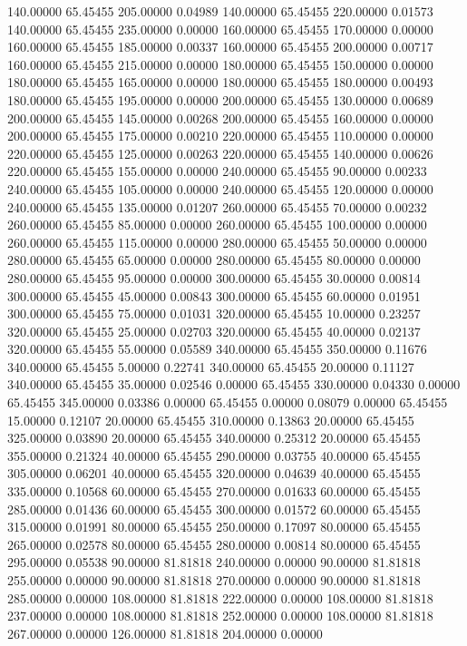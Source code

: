 140.00000 65.45455 205.00000 0.04989
140.00000 65.45455 220.00000 0.01573
140.00000 65.45455 235.00000 0.00000
160.00000 65.45455 170.00000 0.00000
160.00000 65.45455 185.00000 0.00337
160.00000 65.45455 200.00000 0.00717
160.00000 65.45455 215.00000 0.00000
180.00000 65.45455 150.00000 0.00000
180.00000 65.45455 165.00000 0.00000
180.00000 65.45455 180.00000 0.00493
180.00000 65.45455 195.00000 0.00000
200.00000 65.45455 130.00000 0.00689
200.00000 65.45455 145.00000 0.00268
200.00000 65.45455 160.00000 0.00000
200.00000 65.45455 175.00000 0.00210
220.00000 65.45455 110.00000 0.00000
220.00000 65.45455 125.00000 0.00263
220.00000 65.45455 140.00000 0.00626
220.00000 65.45455 155.00000 0.00000
240.00000 65.45455 90.00000 0.00233
240.00000 65.45455 105.00000 0.00000
240.00000 65.45455 120.00000 0.00000
240.00000 65.45455 135.00000 0.01207
260.00000 65.45455 70.00000 0.00232
260.00000 65.45455 85.00000 0.00000
260.00000 65.45455 100.00000 0.00000
260.00000 65.45455 115.00000 0.00000
280.00000 65.45455 50.00000 0.00000
280.00000 65.45455 65.00000 0.00000
280.00000 65.45455 80.00000 0.00000
280.00000 65.45455 95.00000 0.00000
300.00000 65.45455 30.00000 0.00814
300.00000 65.45455 45.00000 0.00843
300.00000 65.45455 60.00000 0.01951
300.00000 65.45455 75.00000 0.01031
320.00000 65.45455 10.00000 0.23257
320.00000 65.45455 25.00000 0.02703
320.00000 65.45455 40.00000 0.02137
320.00000 65.45455 55.00000 0.05589
340.00000 65.45455 350.00000 0.11676
340.00000 65.45455 5.00000 0.22741
340.00000 65.45455 20.00000 0.11127
340.00000 65.45455 35.00000 0.02546
0.00000 65.45455 330.00000 0.04330
0.00000 65.45455 345.00000 0.03386
0.00000 65.45455 0.00000 0.08079
0.00000 65.45455 15.00000 0.12107
20.00000 65.45455 310.00000 0.13863
20.00000 65.45455 325.00000 0.03890
20.00000 65.45455 340.00000 0.25312
20.00000 65.45455 355.00000 0.21324
40.00000 65.45455 290.00000 0.03755
40.00000 65.45455 305.00000 0.06201
40.00000 65.45455 320.00000 0.04639
40.00000 65.45455 335.00000 0.10568
60.00000 65.45455 270.00000 0.01633
60.00000 65.45455 285.00000 0.01436
60.00000 65.45455 300.00000 0.01572
60.00000 65.45455 315.00000 0.01991
80.00000 65.45455 250.00000 0.17097
80.00000 65.45455 265.00000 0.02578
80.00000 65.45455 280.00000 0.00814
80.00000 65.45455 295.00000 0.05538
90.00000 81.81818 240.00000 0.00000
90.00000 81.81818 255.00000 0.00000
90.00000 81.81818 270.00000 0.00000
90.00000 81.81818 285.00000 0.00000
108.00000 81.81818 222.00000 0.00000
108.00000 81.81818 237.00000 0.00000
108.00000 81.81818 252.00000 0.00000
108.00000 81.81818 267.00000 0.00000
126.00000 81.81818 204.00000 0.00000
